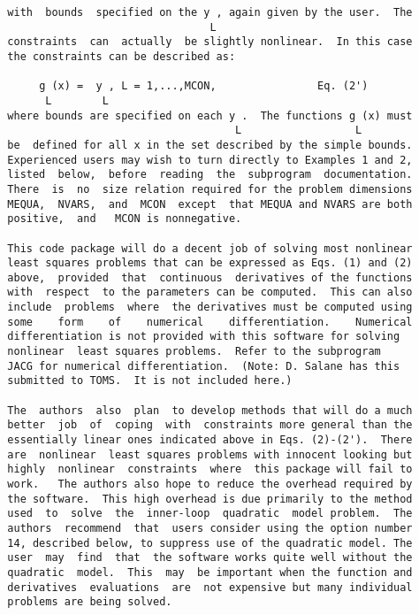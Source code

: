 \begin{verbatim}
  with  bounds  specified on the y , again given by the user.  The
                                  L
  constraints  can  actually  be slightly nonlinear.  In this case
  the constraints can be described as:

       g (x) =  y , L = 1,...,MCON,                Eq. (2')
        L        L
  where bounds are specified on each y .  The functions g (x) must
                                      L                  L
  be  defined for all x in the set described by the simple bounds.
  Experienced users may wish to turn directly to Examples 1 and 2,
  listed  below,  before  reading  the  subprogram  documentation.
  There  is  no  size relation required for the problem dimensions
  MEQUA,  NVARS,  and  MCON  except  that MEQUA and NVARS are both
  positive,  and   MCON is nonnegative.

  This code package will do a decent job of solving most nonlinear
  least squares problems that can be expressed as Eqs. (1) and (2)
  above,  provided  that  continuous  derivatives of the functions
  with  respect  to the parameters can be computed.  This can also
  include  problems  where  the derivatives must be computed using
  some    form    of    numerical    differentiation.    Numerical
  differentiation is not provided with this software for solving
  nonlinear  least squares problems.  Refer to the subprogram
  JACG for numerical differentiation.  (Note: D. Salane has this
  submitted to TOMS.  It is not included here.)

  The  authors  also  plan  to develop methods that will do a much
  better  job  of  coping  with  constraints more general than the
  essentially linear ones indicated above in Eqs. (2)-(2').  There
  are  nonlinear  least squares problems with innocent looking but
  highly  nonlinear  constraints  where  this package will fail to
  work.   The authors also hope to reduce the overhead required by
  the software.  This high overhead is due primarily to the method
  used  to  solve  the  inner-loop  quadratic  model problem.  The
  authors  recommend  that  users consider using the option number
  14, described below, to suppress use of the quadratic model. The
  user  may  find  that  the software works quite well without the
  quadratic  model.  This  may  be important when the function and
  derivatives  evaluations  are  not expensive but many individual
  problems are being solved.


\end{verbatim}
